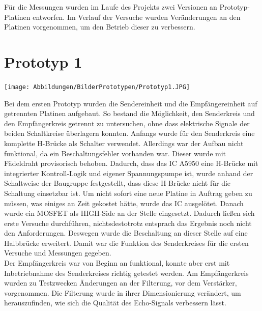 Für die Messungen wurden im Laufe des Projekts zwei Versionen an Prototyp-Platinen entworfen. Im Verlauf der Versuche wurden Veränderungen an den Platinen vorgenommen, um den Betrieb dieser zu verbessern. 
\section{Prototyp 1}
\begin{center}
\begin{minipage}{0.75\textwidth}
\texttt{[image: Abbildungen/BilderPrototypen/Prototyp1.JPG]}
\label{fig:Prototyp1}
\end{minipage}
\end{center}
Bei dem ersten Prototyp wurden die Sendereinheit und die Empfängereinheit auf getrennten Platinen aufgebaut. So bestand die Möglichkeit, den Senderkreis und den Empfängerkreis getrennt zu untersuchen, ohne dass elektrische Signale der beiden Schaltkreise überlagern konnten. Anfangs wurde für den Senderkreis eine komplette H-Brücke als Schalter verwendet. Allerdings war der Aufbau nicht funktional, da ein Beschaltungsfehler vorhanden war. Dieser wurde mit Fädeldraht provisorisch behoben.  Dadurch, dass das IC A5950 eine H-Brücke mit integrierter Kontroll-Logik und eigener Spannungspumpe ist, wurde anhand der Schaltweise der Baugruppe festgestellt, dass diese H-Brücke nicht für die Schaltung einsetzbar ist. Um nicht sofort eine neue Platine in Auftrag geben zu müssen, was einiges an Zeit gekostet hätte, wurde das IC ausgelötet. Danach wurde ein MOSFET als HIGH-Side an der Stelle eingesetzt. Dadurch ließen sich erste Versuche durchführen, nichtsdestotrotz entsprach das Ergebnis noch nicht den Anforderungen. Deswegen wurde die Beschaltung an dieser Stelle auf eine Halbbrücke erweitert. Damit war die Funktion des Senderkreises für die ersten Versuche und Messungen gegeben.\\
Der Empfängerkreis war von Beginn an funktional, konnte aber erst mit Inbetriebnahme des Senderkreises richtig getestet werden. Am Empfängerkreis wurden zu Testzwecken Änderungen an der Filterung, vor dem Verstärker, vorgenommen. Die Filterung wurde in ihrer Dimensionierung verändert, um herauszufinden, wie sich die Qualität des Echo-Signals verbessern lässt.\\


